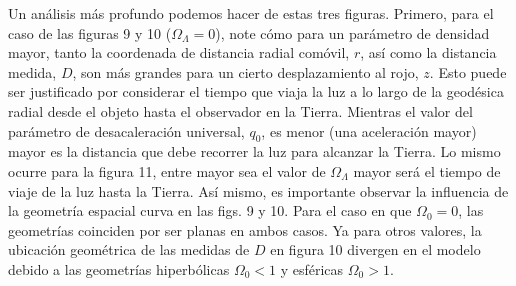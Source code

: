\documentclass[11pt]{article}
\begin{document}
    
    Un análisis más profundo podemos hacer de estas tres figuras. Primero, para el caso de las figuras 9 y 10 ($\Omega_{\Lambda} =0$), note cómo para un parámetro de densidad mayor, tanto la coordenada de distancia radial comóvil, $r$, así como la distancia medida, $D$, son más grandes para un cierto desplazamiento al rojo, $z$. Esto puede ser justificado por considerar el tiempo que viaja la luz a lo largo de la geodésica radial desde el objeto hasta el observador en la Tierra. Mientras el valor del parámetro de desacaleración universal, $q_0$, es menor (una aceleración mayor) mayor es la distancia que debe recorrer la luz para alcanzar la Tierra. Lo mismo ocurre para la figura 11, entre mayor sea el valor de $\Omega_{\Lambda}$ mayor será el tiempo de viaje de la luz hasta la Tierra. Así mismo, es importante observar la influencia de la geometría espacial curva en las figs. 9 y 10. Para el caso en que $\Omega_0 = 0$, las geometrías coinciden por ser planas en ambos casos. Ya para otros valores, la ubicación geométrica de las medidas de $D$ en figura 10 divergen en el modelo debido a las geometrías hiperbólicas $\Omega_0 <1$ y esféricas $\Omega_0 >1$. 
    
\end{document}
